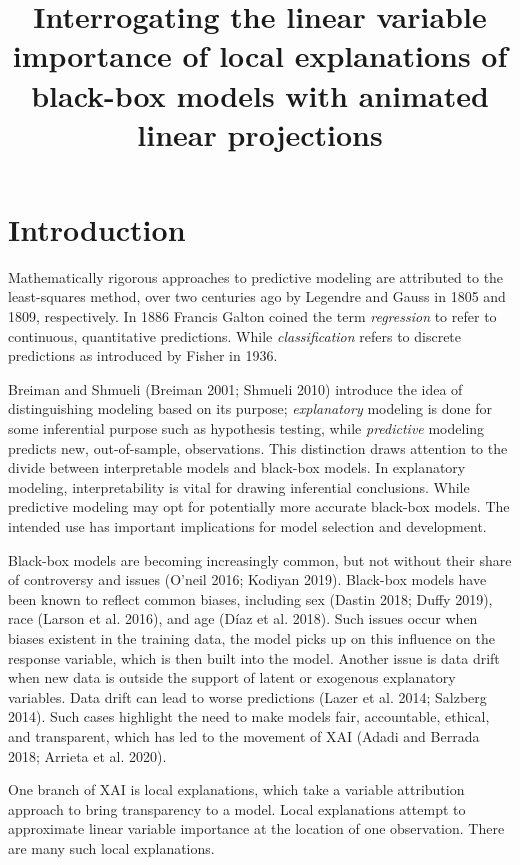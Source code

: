 \documentclass[
  article]{article}
\title{Interrogating the linear variable importance of local explanations of black-box models with animated linear projections}
\author{}
\date{\vspace{-2.5em}}
\begin{document}
\maketitle

\hypertarget{sec:intro}{%
\section{Introduction}\label{sec:intro}}

Mathematically rigorous approaches to predictive modeling are attributed to the least-squares method, over two centuries ago by Legendre and Gauss in 1805 and 1809, respectively. In 1886 Francis Galton coined the term \emph{regression} to refer to continuous, quantitative predictions. While \emph{classification} refers to discrete predictions as introduced by Fisher in 1936.

Breiman and Shmueli (Breiman 2001; Shmueli 2010) introduce the idea of distinguishing modeling based on its purpose; \emph{explanatory} modeling is done for some inferential purpose such as hypothesis testing, while \emph{predictive} modeling predicts new, out-of-sample, observations. This distinction draws attention to the divide between interpretable models and black-box models. In explanatory modeling, interpretability is vital for drawing inferential conclusions. While predictive modeling may opt for potentially more accurate black-box models. The intended use has important implications for model selection and development.

Black-box models are becoming increasingly common, but not without their share of controversy and issues (O'neil 2016; Kodiyan 2019). Black-box models have been known to reflect common biases, including sex (Dastin 2018; Duffy 2019), race (Larson et al. 2016), and age (Díaz et al. 2018). Such issues occur when biases existent in the training data, the model picks up on this influence on the response variable, which is then built into the model. Another issue is data drift when new data is outside the support of latent or exogenous explanatory variables. Data drift can lead to worse predictions (Lazer et al. 2014; Salzberg 2014). Such cases highlight the need to make models fair, accountable, ethical, and transparent, which has led to the movement of XAI (Adadi and Berrada 2018; Arrieta et al. 2020).

One branch of XAI is local explanations, which take a variable attribution approach to bring transparency to a model. Local explanations attempt to approximate linear variable importance at the location of one observation. There are many such local explanations.
\end{document}
